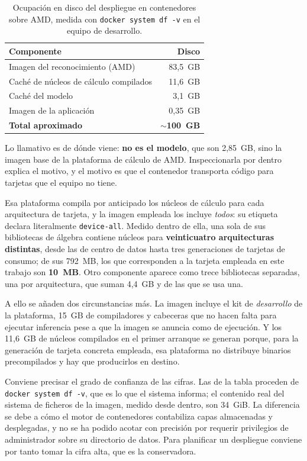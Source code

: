 \begin{table}[H]
\centering
\footnotesize
\begin{tabular}{|l|r|}
\hline
\textbf{Componente} & \textbf{Disco} \\
\hline
Imagen del reconocimiento (AMD) & 83,5~GB \\
\hline
Caché de núcleos de cálculo compilados & 11,6~GB \\
\hline
Caché del modelo & 3,1~GB \\
\hline
Imagen de la aplicación & 0,35~GB \\
\hline
\textbf{Total aproximado} & \textbf{$\sim$100~GB} \\
\hline
\end{tabular}
\caption{Ocupación en disco del despliegue en contenedores sobre AMD, medida con
\texttt{docker system df -v} en el equipo de desarrollo.}
\label{tab:disco}
\end{table}

Lo llamativo es de dónde viene: \textbf{no es el modelo}, que son 2,85~GB, sino la imagen
base de la plataforma de cálculo de AMD. Inspeccionarla por dentro explica el motivo, y el
motivo es que el contenedor transporta código para tarjetas que el equipo no tiene.

Esa plataforma compila por anticipado los núcleos de cálculo para cada arquitectura de
tarjeta, y la imagen empleada los incluye \emph{todos}: su etiqueta declara literalmente
\texttt{device-all}. Medido dentro de ella, una sola de sus bibliotecas de álgebra contiene
núcleos para \textbf{veinticuatro arquitecturas distintas}, desde las de centro de datos
hasta tres generaciones de tarjetas de consumo; de sus 792~MB, los que corresponden a la
tarjeta empleada en este trabajo son \textbf{10~MB}. Otro componente aparece como trece
bibliotecas separadas, una por arquitectura, que suman 4,4~GB y de las que se usa una.

A ello se añaden dos circunstancias más. La imagen incluye el kit de \emph{desarrollo} de la
plataforma, 15~GB de compiladores y cabeceras que no hacen falta para ejecutar inferencia
pese a que la imagen se anuncia como de ejecución. Y los 11,6~GB de núcleos compilados en el
primer arranque se generan porque, para la generación de tarjeta concreta empleada, esa
plataforma no distribuye binarios precompilados y hay que producirlos en destino.

Conviene precisar el grado de confianza de las cifras. Las de la tabla proceden de
\texttt{docker system df -v}, que es lo que el sistema informa; el contenido real del sistema
de ficheros de la imagen, medido desde dentro, son 34~GiB. La diferencia se debe a cómo el
motor de contenedores contabiliza capas almacenadas y desplegadas, y no se ha podido acotar
con precisión por requerir privilegios de administrador sobre su directorio de datos. Para
planificar un despliegue conviene por tanto tomar la cifra alta, que es la conservadora.

